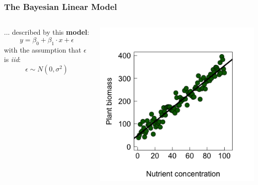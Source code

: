 \documentclass{beamer}
\begin{document}
\begin{frame}
    \frametitle{The Bayesian Linear Model}
    \begin{columns}
        \begin{column}{0.4\textwidth}
            ... described by this \textbf{model}:
            \[
            y = \beta_0 + \beta_1 \cdot x + \epsilon
            \]
            with the assumption that $\epsilon$ is \textit{iid}:
            \[
            \epsilon \sim N(0, \sigma^2)
            \]
        \end{column}
        \begin{column}{0.6\textwidth}
            \includegraphics[width=\textwidth]{lectures/day_11_bayesian_lm/figures/unnamed-chunk-3-1.png}
        \end{column}
    \end{columns}
\end{frame}
\end{document}
